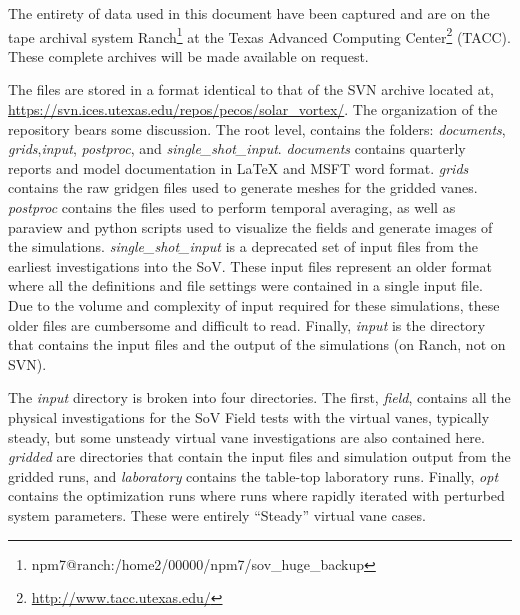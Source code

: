 \label{sec:archiving}


The entirety of data used in this document have been captured and
are on the tape archival system
Ranch\footnote{npm7@ranch:/home2/00000/npm7/sov\_huge\_backup} 
at the Texas Advanced Computing Center\footnote{%
    \url{http://www.tacc.utexas.edu/}
}
(TACC).  These complete archives will be made available on request. 

The files are stored in a format identical to that of the SVN archive
located at,
\url{https://svn.ices.utexas.edu/repos/pecos/solar_vortex/}. The
organization of the repository bears some discussion. The root level,
contains the folders: {\it documents}, {\it grids},{\it input}, {\it
postproc}, and {\it single\_shot\_input}. {\it documents} contains
quarterly reports and model documentation in LaTeX and MSFT word format.  
{\it grids} contains the raw gridgen files used to generate meshes for
the gridded vanes. {\it postproc} contains the files used to perform
temporal averaging, as well as paraview and python scripts used to
visualize the fields and generate images of the simulations. {\it
single\_shot\_input} is a deprecated set of input files from the
earliest investigations into the SoV. These input files represent an
older format where all the definitions and file settings were contained
in a single input file. Due to the volume and complexity of input
required for these simulations, these older files are cumbersome and
 difficult to read. Finally, {\it input} is the directory that
contains the input files and the output of the simulations (on
Ranch, not on SVN). 

The {\it input} directory is broken into four directories. The first,
{\it field}, contains all the physical investigations for the SoV Field
tests with the virtual vanes, typically steady, but some unsteady
virtual vane investigations are also contained here. {\it gridded} are
directories that contain the input files and simulation output from the
gridded runs, and {\it laboratory} contains the table-top laboratory
runs. Finally, {\it opt} contains the optimization runs where runs where
rapidly iterated with perturbed system parameters. These were entirely
``Steady'' virtual vane cases. 

